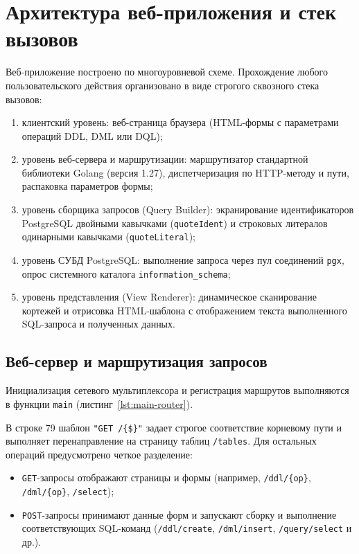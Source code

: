 \section{Архитектура веб-приложения и стек вызовов}
\label{sec:architecture}

Веб-приложение построено по многоуровневой схеме. Прохождение любого пользовательского действия организовано в виде строгого сквозного стека вызовов:
\begin{enumerate}
    \item клиентский уровень: веб-страница браузера (HTML-формы с параметрами операций DDL, DML или DQL);
    \item уровень веб-сервера и маршрутизации: маршрутизатор стандартной библиотеки Golang (версия 1.27), диспетчеризация по HTTP-методу и пути, распаковка параметров формы;
    \item уровень сборщика запросов (Query Builder): экранирование идентификаторов PostgreSQL двойными кавычками (\texttt{quoteIdent}) и строковых литералов одинарными кавычками (\texttt{quoteLiteral});
    \item уровень СУБД PostgreSQL: выполнение запроса через пул соединений \texttt{pgx}, опрос системного каталога \texttt{information\_schema};
    \item уровень представления (View Renderer): динамическое сканирование кортежей и отрисовка HTML-шаблона с отображением текста выполненного SQL-запроса и полученных данных.
\end{enumerate}

\subsection{Веб-сервер и маршрутизация запросов}

Инициализация сетевого мультиплексора и регистрация маршрутов выполняются в функции \texttt{main} (листинг~\ref{lst:main-router}).

\begin{listing}[H]
    \caption{Маршрутизация HTTP-запросов DDL, DML и DQL в \texttt{main.go}}
    \label{lst:main-router}
\end{listing}

В строке 79 шаблон \texttt{"GET /\{\$\}"} задает строгое соответствие корневому пути и выполняет перенаправление на страницу таблиц \texttt{/tables}. Для остальных операций предусмотрено четкое разделение:
\begin{itemize}
    \item \texttt{GET}-запросы отображают страницы и формы (например, \texttt{/ddl/\{op\}}, \texttt{/dml/\{op\}}, \texttt{/select});
    \item \texttt{POST}-запросы принимают данные форм и запускают сборку и выполнение соответствующих SQL-команд (\texttt{/ddl/create}, \texttt{/dml/insert}, \texttt{/query/select} и др.).
\end{itemize}

